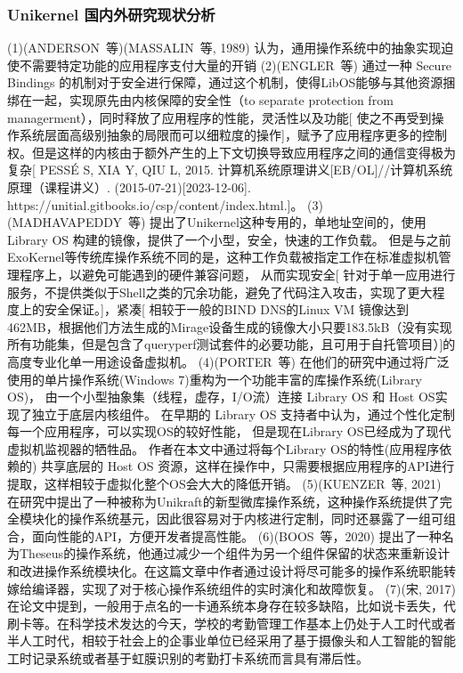 \subsubsection{Unikernel 国内外研究现状分析}

(1)(ANDERSON 等)(MASSALIN 等, 1989) 认为，通用操作系统中的抽象实现迫使不需要特定功能的应用程序支付大量的开销
(2)(ENGLER 等) 通过一种 Secure Bindings 的机制对于安全进行保障，通过这个机制，使得LibOS能够与其他资源捆绑在一起，实现原先由内核保障的安全性（to separate protection from managerment），同时释放了应用程序的性能，灵活性以及功能[ 使之不再受到操作系统层面高级别抽象的局限而可以细粒度的操作]，赋予了应用程序更多的控制权。但是这样的内核由于额外产生的上下文切换导致应用程序之间的通信变得极为复杂[ PESSÉ S, XIA Y, QIU L, 2015. 计算机系统原理讲义[EB/OL]//计算机系统原理（课程讲义）. (2015-07-21)[2023-12-06]. https://unitial.gitbooks.io/csp/content/index.html.]。
(3)(MADHAVAPEDDY 等) 提出了Unikernel这种专用的，单地址空间的，使用Library OS 构建的镜像，提供了一个小型，安全，快速的工作负载。
但是与之前ExoKernel等传统库操作系统不同的是，这种工作负载被指定工作在标准虚拟机管理程序上，以避免可能遇到的硬件兼容问题，
从而实现安全[ 针对于单一应用进行服务，不提供类似于Shell之类的冗余功能，避免了代码注入攻击，实现了更大程度上的安全保证。]，紧凑[ 相较于一般的BIND DNS的Linux VM 镜像达到462MB，根据他们方法生成的Mirage设备生成的镜像大小只要183.5kB（没有实现所有功能集，但是包含了queryperf测试套件的必要功能，且可用于自托管项目）]的高度专业化单一用途设备虚拟机。
(4)(PORTER 等) 在他们的研究中通过将广泛使用的单片操作系统(Windows 7)重构为一个功能丰富的库操作系统(Library OS)，
由一个小型抽象集（线程，虚存，I/O流）连接 Library OS 和 Host OS实现了独立于底层内核组件。
在早期的 Library OS 支持者中认为，通过个性化定制每一个应用程序，可以实现OS的较好性能，
但是现在Library OS已经成为了现代虚拟机监视器的牺牲品。 作者在本文中通过将每个Library OS的特性(应用程序依赖的) 共享底层的 Host OS 资源，这样在操作中，只需要根据应用程序的API进行提取，这样相较于虚拟化整个OS会大大的降低开销。
(5)(KUENZER 等, 2021) 在研究中提出了一种被称为Unikraft的新型微库操作系统，这种操作系统提供了完全模块化的操作系统基元，因此很容易对于内核进行定制，同时还暴露了一组可组合，面向性能的API，方便开发者提高性能。
(6)(BOOS 等，2020) 提出了一种名为Theseus的操作系统，他通过减少一个组件为另一个组件保留的状态来重新设计和改进操作系统模块化。在这篇文章中作者通过设计将尽可能多的操作系统职能转嫁给编译器，实现了对于核心操作系统组件的实时演化和故障恢复。
(7)(宋, 2017)在论文中提到，一般用于点名的一卡通系统本身存在较多缺陷，比如说卡丢失，代刷卡等。在科学技术发达的今天，学校的考勤管理工作基本上仍处于人工时代或者半人工时代，相较于社会上的企事业单位已经采用了基于摄像头和人工智能的智能工时记录系统或者基于虹膜识别的考勤打卡系统而言具有滞后性。

